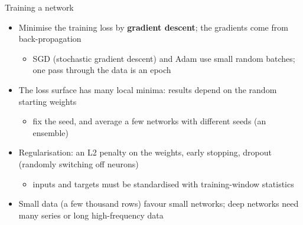 \begin{frame}{Training a network}
\itemsize{\small}
\begin{itemize}
    \item Minimise the training loss by \textbf{gradient descent}; the gradients come from back-propagation 
    \begin{itemize}
        \item SGD (stochastic gradient descent) and Adam use small random batches; one pass through the data is an epoch
    \end{itemize}
    \item The loss surface has many local minima: results depend on the random starting weights
    \begin{itemize}
        \item fix the seed, and average a few networks with different seeds (an ensemble)
    \end{itemize}
    \item Regularisation: an L2 penalty on the weights, early stopping, dropout (randomly switching off neurons)
    \begin{itemize}
        \item inputs and targets must be standardised with training-window statistics
    \end{itemize}
    \item Small data (a few thousand rows) favour small networks; deep networks need many series or long high-frequency data
\end{itemize}
\end{frame}

